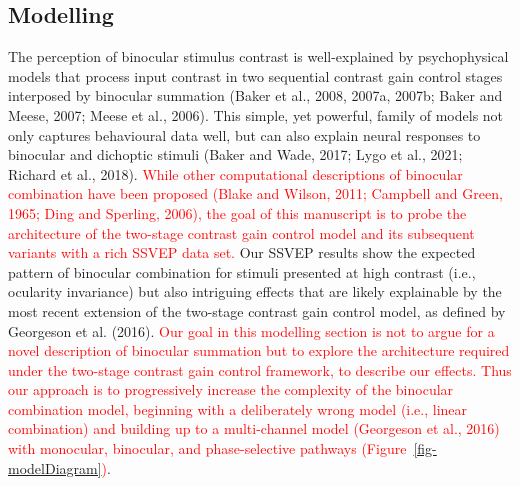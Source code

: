\documentclass[
  12pt,
]{article}
\begin{document}
\subsection{Modelling}\label{modelling}

The perception of binocular stimulus contrast is well-explained by
psychophysical models that process input contrast in two sequential
contrast gain control stages interposed by binocular summation (Baker et
al., 2008, 2007a, 2007b; Baker and Meese, 2007; Meese et al., 2006).
This simple, yet powerful, family of models not only captures
behavioural data well, but can also explain neural responses to
binocular and dichoptic stimuli (Baker and Wade, 2017; Lygo et al.,
2021; Richard et al., 2018). \textcolor{red}{While other computational
descriptions of binocular combination have been proposed (Blake and
Wilson, 2011; Campbell and Green, 1965; Ding and Sperling, 2006), the
goal of this manuscript is to probe the architecture of the two-stage
contrast gain control model and its subsequent variants with a rich
SSVEP data set.} Our SSVEP results show the expected pattern of
binocular combination for stimuli presented at high contrast (i.e.,
ocularity invariance) but also intriguing effects that are likely
explainable by the most recent extension of the two-stage contrast gain
control model, as defined by Georgeson et al. (2016). \textcolor{red}{Our goal
in this modelling section is not to argue for a novel description of
binocular summation but to explore the architecture required under the
two-stage contrast gain control framework, to describe our effects. Thus
our approach is to progressively increase the complexity of the
binocular combination model, beginning with a deliberately wrong model
(i.e., linear combination) and building up to a multi-channel model
(Georgeson et al., 2016) with monocular, binocular, and phase-selective
pathways (Figure~\ref{fig-modelDiagram})}.
\end{document}
